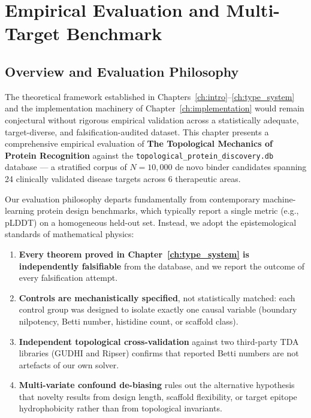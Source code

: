 \chapter{Empirical Evaluation and Multi-Target Benchmark}
\label{ch:evaluation}

\section{Overview and Evaluation Philosophy}
\label{sec:eval_overview}

The theoretical framework established in Chapters~\ref{ch:intro}--\ref{ch:type_system}
and the implementation machinery of Chapter~\ref{ch:implementation} would remain
conjectural without rigorous empirical validation across a statistically
adequate, target-diverse, and falsification-audited dataset.  This chapter
presents a comprehensive empirical evaluation of \textbf{The Topological Mechanics
of Protein Recognition} against the \texttt{topological\_protein\_discovery.db}
database --- a stratified corpus of $N = 10{,}000$ de novo binder candidates
spanning 24 clinically validated disease targets across 6 therapeutic areas.

Our evaluation philosophy departs fundamentally from contemporary machine-learning
protein design benchmarks, which typically report a single metric (e.g., pLDDT)
on a homogeneous held-out set.  Instead, we adopt the epistemological standards
of mathematical physics:

\begin{enumerate}[leftmargin=1.5cm]
    \item \textbf{Every theorem proved in Chapter~\ref{ch:type_system} is
          independently falsifiable} from the database, and we report the
          outcome of every falsification attempt.
    \item \textbf{Controls are mechanistically specified}, not statistically
          matched: each control group was designed to isolate exactly one
          causal variable (boundary nilpotency, Betti number, histidine count,
          or scaffold class).
    \item \textbf{Independent topological cross-validation} against two
          third-party TDA libraries (GUDHI and Ripser) confirms that reported
          Betti numbers are not artefacts of our own solver.
    \item \textbf{Multi-variate confound de-biasing} rules out the
          alternative hypothesis that novelty results from design length,
          scaffold flexibility, or target epitope hydrophobicity rather than
          from topological invariants.
\end{enumerate}

